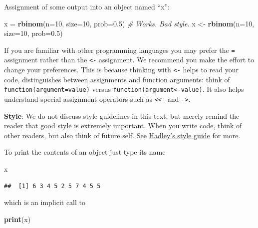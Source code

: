 \documentclass[]{book}
\newenvironment{Shaded}{\begin{snugshade}}{\end{snugshade}}
\newcommand{\KeywordTok}[1]{\textcolor[rgb]{0.13,0.29,0.53}{\textbf{#1}}}
\newcommand{\DataTypeTok}[1]{\textcolor[rgb]{0.13,0.29,0.53}{#1}}
\newcommand{\DecValTok}[1]{\textcolor[rgb]{0.00,0.00,0.81}{#1}}
\newcommand{\FloatTok}[1]{\textcolor[rgb]{0.00,0.00,0.81}{#1}}
\newcommand{\StringTok}[1]{\textcolor[rgb]{0.31,0.60,0.02}{#1}}
\newcommand{\CommentTok}[1]{\textcolor[rgb]{0.56,0.35,0.01}{\textit{#1}}}
\newcommand{\NormalTok}[1]{#1}
\theoremstyle{definition}
\theoremstyle{definition}
\theoremstyle{definition}
\theoremstyle{remark}
\let\BeginKnitrBlock\begin \let\EndKnitrBlock\end
\begin{document}
Assignment of some output into an object named ``x'':

\begin{Shaded}
\begin{Highlighting}[]
\NormalTok{x =}\StringTok{ }\KeywordTok{rbinom}\NormalTok{(}\DataTypeTok{n=}\DecValTok{10}\NormalTok{, }\DataTypeTok{size=}\DecValTok{10}\NormalTok{, }\DataTypeTok{prob=}\FloatTok{0.5}\NormalTok{) }\CommentTok{# Works. Bad style.}
\NormalTok{x <-}\StringTok{ }\KeywordTok{rbinom}\NormalTok{(}\DataTypeTok{n=}\DecValTok{10}\NormalTok{, }\DataTypeTok{size=}\DecValTok{10}\NormalTok{, }\DataTypeTok{prob=}\FloatTok{0.5}\NormalTok{) }
\end{Highlighting}
\end{Shaded}

If you are familiar with other programming languages you may prefer the
\texttt{=} assignment rather than the \texttt{\textless{}-} assignment.
We recommend you make the effort to change your preferences. This is
because thinking with \texttt{\textless{}-} helps to read your code,
distinguishes between assignments and function arguments: think of
\texttt{function(argument=value)} versus
\texttt{function(argument\textless{}-value)}. It also helps understand
special assignment operators such as \texttt{\textless{}\textless{}-}
and \texttt{-\textgreater{}}.

\BeginKnitrBlock{remark}
{}\textbf{Style}: We do not discuss style
guidelines in this text, but merely remind the reader that good style is
extremely important. When you write code, think of other readers, but
also think of future self. See
\href{http://adv-r.had.co.nz/Style.html}{Hadley's style guide} for more.
\EndKnitrBlock{remark}

To print the contents of an object just type its name

\begin{Shaded}
\begin{Highlighting}[]
\NormalTok{x}
\end{Highlighting}
\end{Shaded}

\begin{verbatim}
##  [1] 6 3 4 5 2 5 7 4 5 5
\end{verbatim}

which is an implicit call to

\begin{Shaded}
\begin{Highlighting}[]
\KeywordTok{print}\NormalTok{(x)  }
\end{Highlighting}
\end{Shaded}
\end{document}
